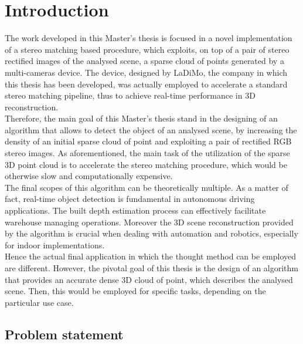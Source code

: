 \chapter{Introduction}
\label{chapter:intro}

The work developed in this Master's thesis is focused in a novel implementation of a stereo matching based procedure, which exploits, on top of a pair of stereo rectified images of the analysed scene, a sparse cloud of points generated by a multi-cameras device.
The device, designed by LaDiMo, the company in which this thesis has been developed, was actually employed to accelerate a standard stereo matching pipeline, thus to achieve real-time performance in 3D reconstruction. \\
Therefore, the main goal of this Master's thesis stand in the designing of an algorithm that allows to detect the object of an analysed scene, by increasing the density of an initial sparse cloud of point and exploiting a pair of rectified RGB stereo images.
As aforementioned, the main task of the utilization of the sparse 3D point cloud is to accelerate the stereo matching procedure, which would be otherwise slow and computationally expensive. \\
The final scopes of this algorithm can be theoretically multiple.
As a matter of fact, real-time object detection is fundamental in autonomous driving applications.
The built depth estimation process can effectively facilitate warehouse managing operations.
Moreover the 3D scene reconstruction provided by the algorithm is crucial when dealing with automation and robotics, especially for indoor implementations.\\
Hence the actual final application in which the thought method can be employed are different.
However, the pivotal goal of this thesis is the design of an algorithm that provides an accurate dense 3D cloud of point, which describes the analysed scene.
Then, this would be employed for specific tasks, depending on the particular use case.

\section{Problem statement}
\label{sec:problem-statement}

